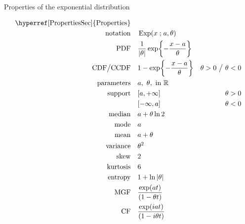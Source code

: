 

\begin{table*}[t!]
\caption[Exponential distribution -- Properties]{Properties of the exponential distribution}
\begin{align*}
\text{\hyperref[PropertiesSec]{Properties}}  \quad& \\
\text{notation} \quad & \op{Exp}(x\given a,\theta)					\checked
\\
\text{PDF}\quad &    \frac{1}{|\theta|} \exp\Left\{-\frac{x-a}{\theta}\Right\} 	\checked
\\
\text{CDF}\big  / \text{CCDF}  \quad  &   1- \exp\Left\{-\frac{x-a}{\theta}\Right\} & \theta>0 \ \big{/} \  \theta<0
\checked
\\
\text{parameters}\quad &   a,\ \theta, \text{ in } \Real 				\checked
\\
\text{support} \quad &   [ a, +\infty]      & \theta>0					\checked
\\
				&   [-\infty,  a]     & \theta <0					\checked
\\
\text{median} \quad  &  a + \theta \ln 2							\checked
\\
\text{mode} \quad  & a										\checked
\\
\text{mean} \quad  &  a+ \theta									\checked						
\\
\text{variance} \quad  & \theta^2								\checked
\\
\text{skew} \quad  &  2										\checked
\\
\text{kurtosis} \quad  &  6										\checked
\\
\text{entropy} \quad  & 1 + \ln |\theta|							\checked
\\
\text{MGF} \quad  & \frac{\exp(at) }{ \Left(1- \theta t\Right)}				\checked
\\
\text{CF} \quad  & \frac{\exp(iat) }{ \Left(1- i \theta t\Right)}				\checked
\end{align*}
\end{table*}
